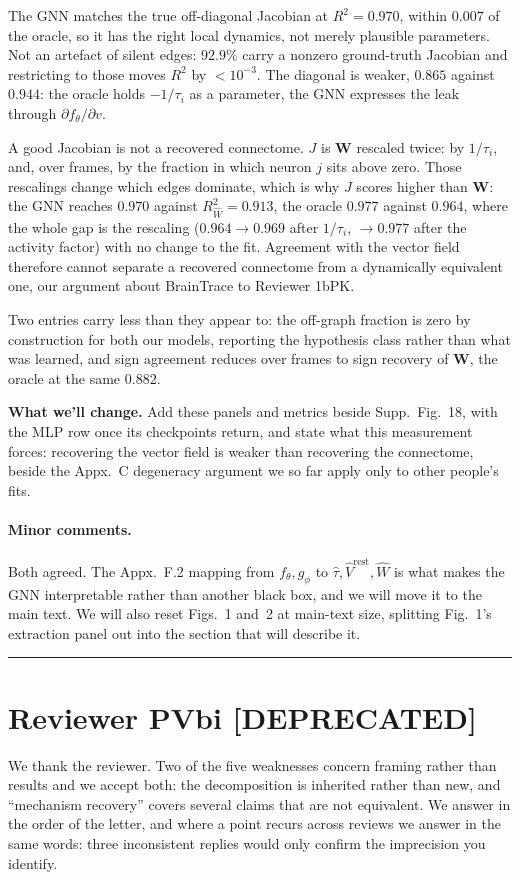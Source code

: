 \documentclass[11pt]{article}
\newcommand{\Rw}{R^2_{\widehat W}}
\newcommand{\Mat}[1]{\mathbf{#1}}
\begin{document}
The GNN matches the true off-diagonal Jacobian at $R^2 = 0.970$, within $0.007$
of the oracle, so it has the right local dynamics, not merely plausible
parameters. Not an artefact of silent edges: $92.9\%$ carry a nonzero
ground-truth Jacobian and restricting to those moves $R^2$ by $<10^{-3}$. The
diagonal is weaker, $0.865$ against $0.944$: the oracle holds $-1/\tau_i$ as a
parameter, the GNN expresses the leak through $\partial f_\theta / \partial v$.

A good Jacobian is not a recovered connectome. $J$ is $\Mat{W}$ rescaled twice:
by $1/\tau_i$, and, over frames, by the fraction in which neuron $j$ sits above
zero. Those rescalings change which edges dominate, which is why $J$ scores
higher than $\Mat{W}$: the GNN reaches $0.970$ against $\Rw = 0.913$, the oracle
$0.977$ against $0.964$, where the whole gap is the rescaling ($0.964 \to 0.969$
after $1/\tau_i$, $\to 0.977$ after the activity factor) with no change to the
fit. Agreement with the vector field therefore cannot separate a recovered
connectome from a dynamically equivalent one, our argument about BrainTrace to
Reviewer 1bPK.

Two entries carry less than they appear to: the off-graph fraction is zero by
construction for both our models, reporting the hypothesis class rather than what
was learned, and sign agreement reduces over frames to sign recovery of
$\Mat{W}$, the oracle at the same $0.882$.

\textbf{What we'll change.} Add these panels and metrics beside Supp.~Fig.~18,
with the MLP row once its checkpoints return, and state what this measurement
forces: recovering the vector field is weaker than recovering the connectome,
beside the Appx.~C degeneracy argument we so far apply only to other people's
fits.

\paragraph{Minor comments.}
Both agreed. The Appx.~F.2 mapping from $f_\theta, g_\phi$ to
$\hat\tau, \widehat V^{\mathrm{rest}}, \widehat W$ is what makes the GNN
interpretable rather than another black box, and we will move it to the main
text. We will also reset Figs.~1 and~2 at main-text size, splitting Fig.~1's
extraction panel out into the section that will describe it.

\bigskip
\hrule
\bigskip

\section*{Reviewer PVbi [DEPRECATED] }
We thank the reviewer. Two of the five weaknesses concern framing rather than
results and we accept both: the decomposition is inherited rather than new, and
``mechanism recovery'' covers several claims that are not equivalent. We answer
in the order of the letter, and where a point recurs across
reviews we answer in the same words: three inconsistent replies would only
confirm the imprecision you identify.
\end{document}
